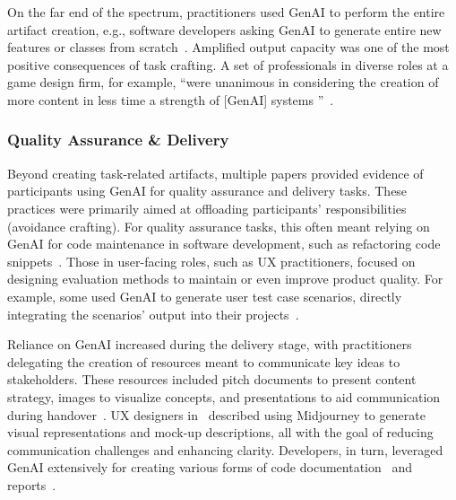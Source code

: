 On the far end of the spectrum, practitioners used GenAI to perform the entire artifact creation, e.g., software developers asking GenAI to generate entire new features or classes from scratch~\cite{19,11}. Amplified output capacity was one of the most positive consequences of task crafting. A set of professionals in diverse roles at a game design firm, for example, ``were unanimous in considering the creation of more content in less time a strength of [GenAI] systems ''~\cite{9}. 

\subsubsection{Quality Assurance \& Delivery} 
Beyond creating task-related artifacts, multiple papers provided evidence of participants using GenAI for quality assurance and delivery tasks. These practices were primarily aimed at offloading participants' responsibilities (avoidance crafting). For quality assurance tasks, this often meant relying on GenAI for code maintenance in software development, such as refactoring code snippets~\cite{4,19}. Those in user-facing roles, such as UX practitioners, focused on designing evaluation methods to maintain or even improve product quality. For example, some used GenAI to generate user test case scenarios, directly integrating the scenarios' output into their projects~\cite{21}.

Reliance on GenAI increased during the delivery stage, with practitioners delegating the creation of resources meant to communicate key ideas to stakeholders. These resources included pitch documents to present content strategy, images to visualize concepts, and presentations to aid communication during handover~\cite{9,10,12,21}. UX designers in~\cite{10,21} described using Midjourney to generate visual representations and mock-up descriptions, all with the goal of reducing communication challenges and enhancing clarity. Developers, in turn, leveraged GenAI extensively for creating various forms of code documentation~\cite{4,19} and reports~\cite{8}.

